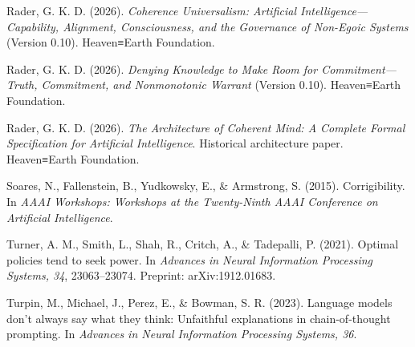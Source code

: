\documentclass[
  11pt,
]{article}
\begin{document}
Rader, G. K. D. (2026). \emph{Coherence Universalism: Artificial
Intelligence---Capability, Alignment, Consciousness, and the Governance
of Non-Egoic Systems} (Version 0.10). Heaven≡Earth Foundation.

Rader, G. K. D. (2026). \emph{Denying Knowledge to Make Room for
Commitment---Truth, Commitment, and Nonmonotonic Warrant} (Version
0.10). Heaven≡Earth Foundation.

Rader, G. K. D. (2026). \emph{The Architecture of Coherent Mind: A
Complete Formal Specification for Artificial Intelligence}. Historical
architecture paper. Heaven≡Earth Foundation.

Soares, N., Fallenstein, B., Yudkowsky, E., \& Armstrong, S. (2015).
Corrigibility. In \emph{AAAI Workshops: Workshops at the Twenty-Ninth
AAAI Conference on Artificial Intelligence}.

Turner, A. M., Smith, L., Shah, R., Critch, A., \& Tadepalli, P. (2021).
Optimal policies tend to seek power. In \emph{Advances in Neural
Information Processing Systems, 34}, 23063--23074. Preprint:
arXiv:1912.01683.

Turpin, M., Michael, J., Perez, E., \& Bowman, S. R. (2023). Language
models don't always say what they think: Unfaithful explanations in
chain-of-thought prompting. In \emph{Advances in Neural Information
Processing Systems, 36}.
\end{document}
